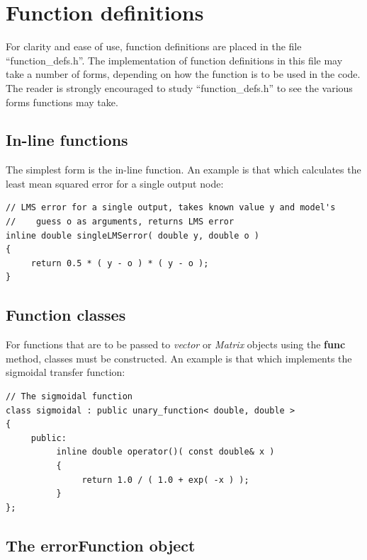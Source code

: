 \documentclass{report}
\begin{document}


\section{Function definitions}

For clarity and ease of use, function definitions are placed in the
file ``function\_defs.h''. The implementation of function definitions
in this file may take a number of forms, depending on how the function
is to be used in the code.  The reader is strongly encouraged to study
``function\_defs.h'' to see the various forms functions may take.

\subsection{In-line functions}

The simplest form is the in-line function.  An example is that which
calculates the least mean squared error for a single output node:

\begin{verbatim}
// LMS error for a single output, takes known value y and model's
//    guess o as arguments, returns LMS error
inline double singleLMSerror( double y, double o )
{
     return 0.5 * ( y - o ) * ( y - o );
}
\end{verbatim}

\subsection{Function classes}

For functions that are to be passed to {\em vector} or {\em Matrix}
objects using the {\bf func} method, classes must be constructed.
An example is that which implements the sigmoidal transfer function:

\begin{verbatim}
// The sigmoidal function
class sigmoidal : public unary_function< double, double >
{
     public:
          inline double operator()( const double& x )
          {
               return 1.0 / ( 1.0 + exp( -x ) );
          }
};
\end{verbatim}

\subsection{The errorFunction object}\label{errFunc}
\end{document}
